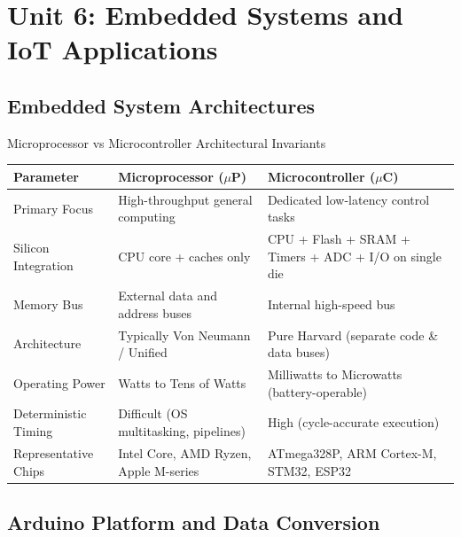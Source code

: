 \chapter{Unit 6: Embedded Systems and IoT Applications}

\section{Embedded System Architectures}

\begin{formulabox}{Microprocessor vs Microcontroller Architectural Invariants}
\begin{center}\small
\begin{tabularx}{\linewidth}{l X X}
\toprule
\textbf{Parameter} & \textbf{Microprocessor ($\mu$P)} & \textbf{Microcontroller ($\mu$C)} \\
\midrule
Primary Focus & High-throughput general computing & Dedicated low-latency control tasks \\
Silicon Integration & CPU core + caches only & CPU + Flash + SRAM + Timers + ADC + I/O on single die \\
Memory Bus & External data and address buses & Internal high-speed bus \\
Architecture & Typically Von Neumann / Unified & Pure Harvard (separate code \& data buses) \\
Operating Power & Watts to Tens of Watts & Milliwatts to Microwatts (battery-operable) \\
Deterministic Timing & Difficult (OS multitasking, pipelines) & High (cycle-accurate execution) \\
Representative Chips & Intel Core, AMD Ryzen, Apple M-series & ATmega328P, ARM Cortex-M, STM32, ESP32 \\
\bottomrule
\end{tabularx}
\end{center}
\end{formulabox}

\section{Arduino Platform and Data Conversion}

